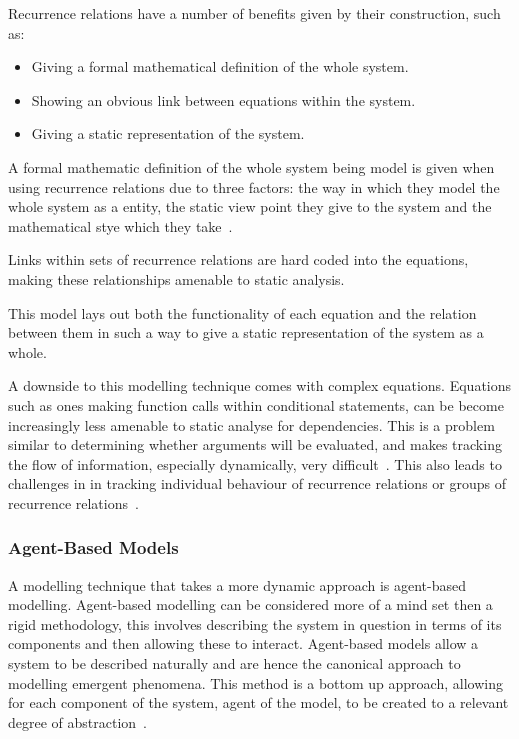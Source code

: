 \documentclass{article}
\begin{document}
Recurrence relations have a number of benefits given by their construction, such as:
\begin{itemize}
    \item Giving a formal mathematical definition of the whole system.
    \item Showing an obvious link between equations within the system.
    \item Giving a static representation of the system.
\end{itemize}

A formal mathematic definition of the whole system being model is given when using recurrence relations due to three factors: the way in which they model the whole system as a entity, the static view point they give to the system and the mathematical stye which they take~\cite{rrformulism}.  %

Links within sets of recurrence relations are hard coded into the equations, making these relationships amenable to static analysis.      

This model lays out both the functionality of each equation and the relation between them in such a way to give a static representation of the system as a whole. 

A downside to this modelling technique comes with complex equations. Equations such as ones making function calls within conditional statements, can be become increasingly less amenable to static analyse for dependencies. This is a problem similar to determining whether arguments will be evaluated, and makes tracking the flow of information, especially dynamically, very difficult~\cite{willevaluteargsa}. This also leads to challenges in in tracking individual behaviour of recurrence relations or groups of recurrence relations~\cite{rrbtrack}.         







\subsubsection{Agent-Based Models}
A modelling technique that takes a more dynamic approach is agent-based modelling. Agent-based modelling can be considered more of a mind set then a rigid methodology, this involves describing the system in question in terms of its components and then allowing these to interact. Agent-based models allow a system to be described naturally and are hence the canonical approach to modelling emergent phenomena. This method is a bottom up approach, allowing for each component of the system, agent of the model, to be created to a relevant degree of abstraction~\cite{abmhumsystems}.
\end{document}
